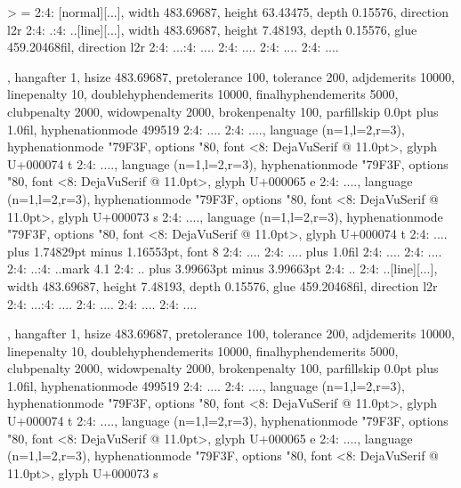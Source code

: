 \start \switchtobodyfont[5pt]
\starttyping[option=TEX]
> =
2:4: \vbox[normal][...], width 483.69687, height 63.43475, depth 0.15576, direction l2r
2:4: .:4: ..\hbox[line][...], width 483.69687, height 7.48193, depth 0.15576, glue 459.20468fil, direction l2r
2:4: ...:4: ....
2:4: ....\glue[left][...] 0.0pt
2:4: ....\glue[parfillleft][...] 0.0pt
2:4: ....\par[newgraf][...], hangafter 1, hsize 483.69687, pretolerance 100, tolerance 200, adjdemerits 10000, linepenalty 10, doublehyphendemerits 10000, finalhyphendemerits 5000, clubpenalty 2000, widowpenalty 2000, brokenpenalty 100, parfillskip 0.0pt plus 1.0fil, hyphenationmode 499519
2:4: ....\glue[indent][...] 0.0pt
2:4: ....\glyph[32768][...], language (n=1,l=2,r=3), hyphenationmode "79F3F, options "80, font <8: DejaVuSerif @ 11.0pt>, glyph U+000074 t
2:4: ....\glyph[32768][...], language (n=1,l=2,r=3), hyphenationmode "79F3F, options "80, font <8: DejaVuSerif @ 11.0pt>, glyph U+000065 e
2:4: ....\glyph[32768][...], language (n=1,l=2,r=3), hyphenationmode "79F3F, options "80, font <8: DejaVuSerif @ 11.0pt>, glyph U+000073 s
2:4: ....\glyph[32768][...], language (n=1,l=2,r=3), hyphenationmode "79F3F, options "80, font <8: DejaVuSerif @ 11.0pt>, glyph U+000074 t
2:4: ....\glue[space][...] 3.49658pt plus 1.74829pt minus 1.16553pt, font 8
2:4: ....
2:4: ....\glue[parfill][...] 0.0pt plus 1.0fil
2:4: ....\glue[right][...] 0.0pt
2:4: ....
2:4: ..:4: ..{mark 4.1}
2:4: ..\glue[par][...] 11.98988pt plus 3.99663pt minus 3.99663pt
2:4: ..\glue[baseline][...] 8.34883pt
2:4: ..\hbox[line][...], width 483.69687, height 7.48193, depth 0.15576, glue 459.20468fil, direction l2r
2:4: ...:4: ....
2:4: ....\glue[left][...] 0.0pt
2:4: ....\glue[parfillleft][...] 0.0pt
2:4: ....\par[newgraf][...], hangafter 1, hsize 483.69687, pretolerance 100, tolerance 200, adjdemerits 10000, linepenalty 10, doublehyphendemerits 10000, finalhyphendemerits 5000, clubpenalty 2000, widowpenalty 2000, brokenpenalty 100, parfillskip 0.0pt plus 1.0fil, hyphenationmode 499519
2:4: ....\glue[indent][...] 0.0pt
2:4: ....\glyph[32768][...], language (n=1,l=2,r=3), hyphenationmode "79F3F, options "80, font <8: DejaVuSerif @ 11.0pt>, glyph U+000074 t
2:4: ....\glyph[32768][...], language (n=1,l=2,r=3), hyphenationmode "79F3F, options "80, font <8: DejaVuSerif @ 11.0pt>, glyph U+000065 e
2:4: ....\glyph[32768][...], language (n=1,l=2,r=3), hyphenationmode "79F3F, options "80, font <8: DejaVuSerif @ 11.0pt>, glyph U+000073 s
